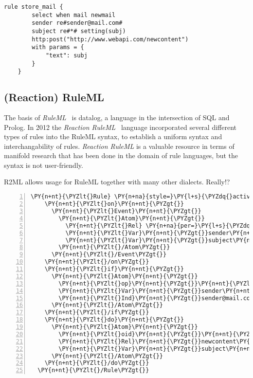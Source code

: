 \begin{lstlisting}[frame=single,float=h,label=lstkre,language=KRE,caption=E-Mail Example rule in KRL]
	rule store_mail {
		select when mail newmail
		sender re#sender@mail.com#
		subject re#*# setting(subj)
		http:post("http://www.webapi.com/newcontent")
		with params = {
			"text": subj
		}
	}
\end{lstlisting}


\subsection{(Reaction) RuleML}
The basis of \emph{RuleML}~\cite{2006-Boley-RuleML.pdf} is datalog, a language in the intersection of SQL and Prolog.
In 2012 the \emph{Reaction RuleML}~\cite{2012-Paschke_etal-ReactionRuleML.pdf} language incorporated several different types of rules into the RuleML syntax, to establish a uniform syntax and interchangability of rules.
\emph{Reaction RuleML} is a valuable resource in terms of manifold research that has been done in the domain of rule languages, but the syntax is not user-friendly.


R2ML allows usage for RuleML together with many other dialects. Really!?

\begin{Verbatim}[frame=single,fontsize=\footnotesize,commandchars=\\\{\},numbers=left,firstnumber=1,stepnumber=1,xleftmargin
=.3in]
  \PY{n+nt}{\PYZlt{}Rule} \PY{n+na}{style=}\PY{l+s}{\PYZdq{}active\PYZdq{}}\PY{n+nt}{\PYZgt{}}
    \PY{n+nt}{\PYZlt{}on}\PY{n+nt}{\PYZgt{}}
      \PY{n+nt}{\PYZlt{}Event}\PY{n+nt}{\PYZgt{}}
        \PY{n+nt}{\PYZlt{}Atom}\PY{n+nt}{\PYZgt{}}
          \PY{n+nt}{\PYZlt{}Rel} \PY{n+na}{per=}\PY{l+s}{\PYZdq{}value\PYZdq{}}\PY{n+nt}{\PYZgt{}}mail\PY{n+nt}{\PYZlt{}/Rel\PYZgt{}}
          \PY{n+nt}{\PYZlt{}Var}\PY{n+nt}{\PYZgt{}}sender\PY{n+nt}{\PYZlt{}/Var\PYZgt{}}
          \PY{n+nt}{\PYZlt{}Var}\PY{n+nt}{\PYZgt{}}subject\PY{n+nt}{\PYZlt{}/Var\PYZgt{}}
        \PY{n+nt}{\PYZlt{}/Atom\PYZgt{}}
      \PY{n+nt}{\PYZlt{}/Event\PYZgt{}}
    \PY{n+nt}{\PYZlt{}/on\PYZgt{}}
    \PY{n+nt}{\PYZlt{}if}\PY{n+nt}{\PYZgt{}}
      \PY{n+nt}{\PYZlt{}Atom}\PY{n+nt}{\PYZgt{}}
        \PY{n+nt}{\PYZlt{}op}\PY{n+nt}{\PYZgt{}}\PY{n+nt}{\PYZlt{}Rel}\PY{n+nt}{\PYZgt{}}equals\PY{n+nt}{\PYZlt{}/Rel\PYZgt{}}\PY{n+nt}{\PYZlt{}/op\PYZgt{}}
        \PY{n+nt}{\PYZlt{}Var}\PY{n+nt}{\PYZgt{}}sender\PY{n+nt}{\PYZlt{}/Var\PYZgt{}}
        \PY{n+nt}{\PYZlt{}Ind}\PY{n+nt}{\PYZgt{}}sender@mail.com\PY{n+nt}{\PYZlt{}/Ind\PYZgt{}}
      \PY{n+nt}{\PYZlt{}/Atom\PYZgt{}}
    \PY{n+nt}{\PYZlt{}/if\PYZgt{}}
    \PY{n+nt}{\PYZlt{}do}\PY{n+nt}{\PYZgt{}}
      \PY{n+nt}{\PYZlt{}Atom}\PY{n+nt}{\PYZgt{}}
        \PY{n+nt}{\PYZlt{}oid}\PY{n+nt}{\PYZgt{}}\PY{n+nt}{\PYZlt{}Ind} \PY{n+na}{uri=}\PY{l+s}{\PYZdq{}http://webapi.com\PYZdq{}}\PY{n+nt}{/\PYZgt{}}\PY{n+nt}{\PYZlt{}/oid\PYZgt{}}
        \PY{n+nt}{\PYZlt{}Rel}\PY{n+nt}{\PYZgt{}}newcontent\PY{n+nt}{\PYZlt{}/Rel\PYZgt{}}
        \PY{n+nt}{\PYZlt{}Var}\PY{n+nt}{\PYZgt{}}subject\PY{n+nt}{\PYZlt{}/Var\PYZgt{}} 
      \PY{n+nt}{\PYZlt{}/Atom\PYZgt{}}
    \PY{n+nt}{\PYZlt{}/do\PYZgt{}}
  \PY{n+nt}{\PYZlt{}/Rule\PYZgt{}}
\end{Verbatim}


